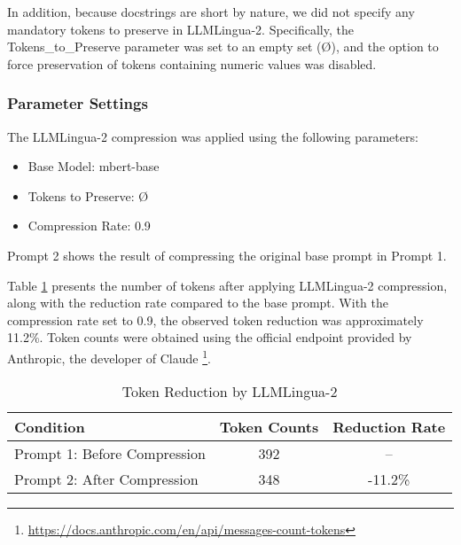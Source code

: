 In addition, because docstrings are short by nature, we did not specify any mandatory tokens to preserve in LLMLingua-2. Specifically, the Tokens\_to\_Preserve parameter was set to an empty set (Ø), and the option to force preservation of tokens containing numeric values was disabled.

\subsubsection{Parameter Settings}
The LLMLingua-2 compression was applied using the following parameters:

\begin{itemize}[label={$\bullet$}]
    \item Base Model: mbert-base
\vspace{0.2cm}
    \item Tokens to Preserve: Ø
\vspace{0.2cm}
    \item Compression Rate: 0.9
\end{itemize}

Prompt 2 shows the result of compressing the original base prompt in Prompt 1.



Table \ref{tab:token_reduction_llmlingua2} presents the number of tokens after applying LLMLingua-2 compression, along with the reduction rate compared to the base prompt. With the compression rate set to 0.9, the observed token reduction was approximately 11.2\%. Token counts were obtained using the official endpoint provided by Anthropic, the developer of Claude \footnote{\url{https://docs.anthropic.com/en/api/messages-count-tokens}}.

\begin{table}[h!]
  \centering
  \caption{Token Reduction by LLMLingua-2}
  \label{tab:token_reduction_llmlingua2}
  \begin{tabular}{|l|c|c|}
    \hline
    \textbf{Condition} & \textbf{Token Counts} & \textbf{Reduction Rate} \\
    \hline
    Prompt 1: Before Compression & 392 & -- \\
    Prompt 2: After Compression  & 348 & -11.2\% \\
    \hline
  \end{tabular}
\end{table}
